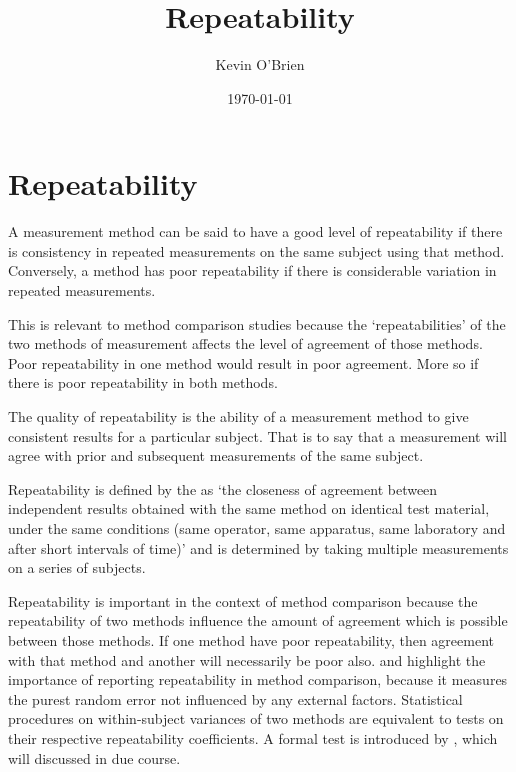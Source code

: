 \documentclass[12pt, a4paper]{article}
\begin{document}
	\author{Kevin O'Brien}
	\title{Repeatability}
	\date{\today}
	\maketitle

	\section{Repeatability}
	A measurement method can be said to have a good level of repeatability if there is consistency in repeated measurements on the same subject using that method. Conversely, a method has poor repeatability if there is considerable variation in repeated measurements.
	
	This is relevant to method comparison studies because the `repeatabilities' of the two methods of measurement affects the level of agreement of those methods. Poor repeatability in one method would result in poor agreement. More so if there is poor repeatability in both methods.

	


The quality of repeatability is the ability of a measurement method to give consistent results for a particular subject. That is to say that a measurement will agree with prior and subsequent measurements of the same subject.

Repeatability is defined by the \citet{IUPAC} as `the closeness of agreement between independent results obtained with the same method on identical test material, under the same conditions (same
operator, same apparatus, same laboratory and after short intervals of time)'  and is determined by taking multiple measurements on a series of subjects.

Repeatability is important in the context of method comparison because the repeatability of two methods influence the amount of agreement which is possible between those methods. If one method have poor repeatability, then agreement with that method and another will necessarily be poor also.
\citet{barnhart} and \citet{roy} highlight the importance of reporting repeatability in method comparison, because it measures the purest random error not influenced by any external factors. Statistical procedures on within-subject variances of two methods are equivalent to tests on their respective repeatability coefficients. A formal test is introduced by \citet{roy}, which will discussed in due course.
\end{document}
